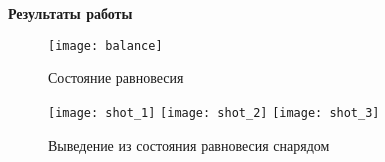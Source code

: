 \textbf{Результаты работы}

\begin{figure}[h]
\centering
\texttt{[image: balance]}
\caption{Состояние равновесия}
\end{figure}

\begin{figure}[h]
\centering
\texttt{[image: shot\_1]}\hfill
\texttt{[image: shot\_2]}
\vfill
\texttt{[image: shot\_3]}
\caption{Выведение из состояния равновесия снарядом}
\end{figure}
\pagebreak
